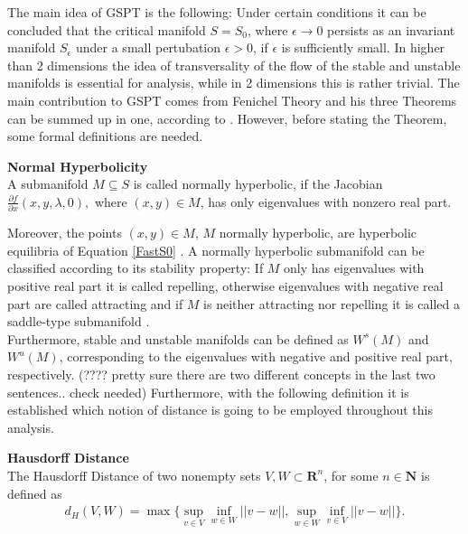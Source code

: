 The main idea of GSPT is the following: Under certain conditions it can be concluded that the critical manifold $S=S_0$, where $\epsilon \to 0$ persists as an invariant manifold $S_{\epsilon}$ under a small pertubation $\epsilon >0$, if $\epsilon$ is sufficiently small. In higher than 2 dimensions the idea of transversality of the flow of the stable and unstable manifolds is essential for analysis, while in 2 dimensions this is rather trivial. The main contribution to GSPT comes from Fenichel Theory and his three Theorems can be summed up in one, according to \citep{MMO}.
However, before stating the Theorem, some formal definitions are needed.

\begin{definition}{\textbf{Normal Hyperbolicity \citep{firstpaper}}} \label{NormHyp}
	\\
	A submanifold $M \subseteq S$ is called normally hyperbolic, if the Jacobian $ \frac{\partial f}{\partial x}(x,y, \lambda, 0),$ where $(x,y) \in M$, has only eigenvalues with nonzero real part.
\end{definition} 

Moreover, the points $(x,y) \in M$, $M$ normally hyperbolic, are hyperbolic equilibria of Equation \ref{FastS0} \citep{MMO}.
A normally hyperbolic submanifold can be classified according to its stability property: If $M$ only has eigenvalues with positive real part it is called repelling, otherwise eigenvalues with negative real part are called attracting and if $M$ is neither attracting nor repelling it is called a saddle-type submanifold \citep{MMO}. \\

Furthermore, stable and unstable manifolds can be defined as $W^s(M)$  and $W^u(M)$, corresponding to the eigenvalues with negative and positive real part, respectively.
(???? pretty sure there are two different concepts in the last two sentences.. check needed)
Furthermore, with the following definition it is established which notion of distance is going to be employed throughout this analysis.

\begin{definition}{\textbf{Hausdorff Distance \citep{Kuehn}}}\\
	The Hausdorff Distance of two nonempty sets $V,W \subset \mathbf{R}^n$, for some $n \in \mathbf{N}$ 
	is defined as 
	\begin{align*}
	d_H(V,W)= \max \{ \sup_{v \in V} \inf_{w \in W} || v- w ||, \sup_ {w \in W}\inf_{v \in V} || v- w ||\}.
	\end{align*}
\end{definition}

